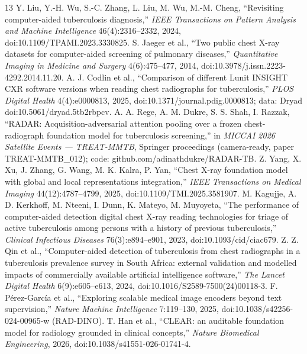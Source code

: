 \documentclass[12pt,a4paper]{report}
\begin{document}
\begin{thebibliography}{13}\small
{} Y. Liu, Y.-H. Wu, S.-C. Zhang, L. Liu, M. Wu, M.-M. Cheng, ``Revisiting computer-aided tuberculosis diagnosis,'' \emph{IEEE Transactions on Pattern Analysis and Machine Intelligence} 46(4):2316--2332, 2024, doi:10.1109/TPAMI.2023.3330825.
 S. Jaeger et al., ``Two public chest X-ray datasets for computer-aided screening of pulmonary diseases,'' \emph{Quantitative Imaging in Medicine and Surgery} 4(6):475--477, 2014, doi:10.3978/j.issn.2223-4292.2014.11.20.
 A. J. Codlin et al., ``Comparison of different Lunit INSIGHT CXR software versions when reading chest radiographs for tuberculosis,'' \emph{PLOS Digital Health} 4(4):e0000813, 2025, doi:10.1371/journal.pdig.0000813; data: Dryad doi:10.5061/dryad.5tb2rbpcv.
 A. A. Rege, A. M. Dukre, S. S. Shah, I. Razzak, ``RADAR: Acquisition-adversarial attention pooling over a frozen chest-radiograph foundation model for tuberculosis screening,'' in \emph{MICCAI 2026 Satellite Events --- TREAT-MMTB}, Springer proceedings (camera-ready, paper TREAT-MMTB\_012); code: github.com/adinathdukre/RADAR-TB.
 Z. Yang, X. Xu, J. Zhang, G. Wang, M. K. Kalra, P. Yan, ``Chest X-ray foundation model with global and local representations integration,'' \emph{IEEE Transactions on Medical Imaging} 44(12):4787--4799, 2025, doi:10.1109/TMI.2025.3581907.
 M. Kagujje, A. D. Kerkhoff, M. Nteeni, I. Dunn, K. Mateyo, M. Muyoyeta, ``The performance of computer-aided detection digital chest X-ray reading technologies for triage of active tuberculosis among persons with a history of previous tuberculosis,'' \emph{Clinical Infectious Diseases} 76(3):e894--e901, 2023, doi:10.1093/cid/ciac679.
 Z. Z. Qin et al., ``Computer-aided detection of tuberculosis from chest radiographs in a tuberculosis prevalence survey in South Africa: external validation and modelled impacts of commercially available artificial intelligence software,'' \emph{The Lancet Digital Health} 6(9):e605--e613, 2024, doi:10.1016/S2589-7500(24)00118-3.
 F. P\'erez-Garc\'ia et al., ``Exploring scalable medical image encoders beyond text supervision,'' \emph{Nature Machine Intelligence} 7:119--130, 2025, doi:10.1038/s42256-024-00965-w (RAD-DINO).
 T. Han et al., ``CLEAR: an auditable foundation model for radiology grounded in clinical concepts,'' \emph{Nature Biomedical Engineering}, 2026, doi:10.1038/s41551-026-01741-4.

\end{thebibliography}
\end{document}
